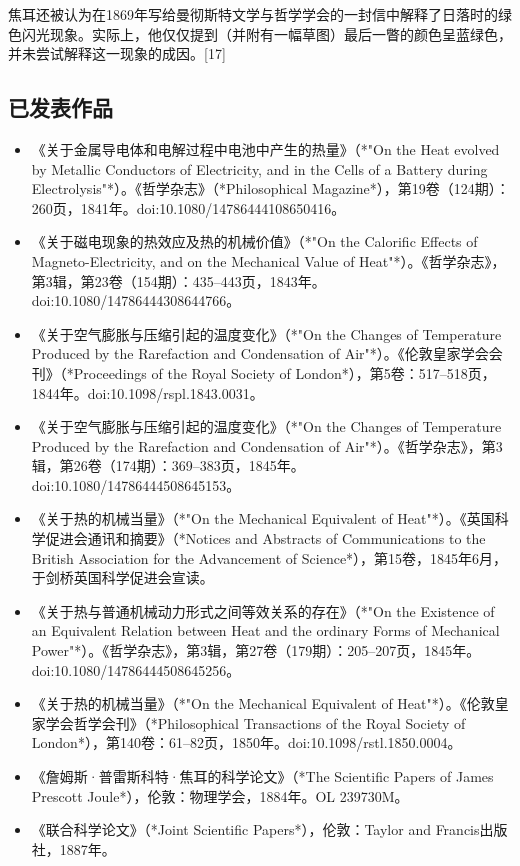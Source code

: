 焦耳还被认为在1869年写给曼彻斯特文学与哲学学会的一封信中解释了日落时的绿色闪光现象。实际上，他仅仅提到（并附有一幅草图）最后一瞥的颜色呈蓝绿色，并未尝试解释这一现象的成因。[17]

\subsection{已发表作品}

\begin{itemize}
\item 《关于金属导电体和电解过程中电池中产生的热量》（*"On the Heat evolved by Metallic Conductors of Electricity, and in the Cells of a Battery during Electrolysis"*）。《哲学杂志》（*Philosophical Magazine*），第19卷（124期）：260页，1841年。doi:10.1080/14786444108650416。  
\item 《关于磁电现象的热效应及热的机械价值》（*"On the Calorific Effects of Magneto-Electricity, and on the Mechanical Value of Heat"*）。《哲学杂志》，第3辑，第23卷（154期）：435–443页，1843年。doi:10.1080/14786444308644766。  
\item 《关于空气膨胀与压缩引起的温度变化》（*"On the Changes of Temperature Produced by the Rarefaction and Condensation of Air"*）。《伦敦皇家学会会刊》（*Proceedings of the Royal Society of London*），第5卷：517–518页，1844年。doi:10.1098/rspl.1843.0031。  
\item 《关于空气膨胀与压缩引起的温度变化》（*"On the Changes of Temperature Produced by the Rarefaction and Condensation of Air"*）。《哲学杂志》，第3辑，第26卷（174期）：369–383页，1845年。doi:10.1080/14786444508645153。  
\item 《关于热的机械当量》（*"On the Mechanical Equivalent of Heat"*）。《英国科学促进会通讯和摘要》（*Notices and Abstracts of Communications to the British Association for the Advancement of Science*），第15卷，1845年6月，于剑桥英国科学促进会宣读。  
\item 《关于热与普通机械动力形式之间等效关系的存在》（*"On the Existence of an Equivalent Relation between Heat and the ordinary Forms of Mechanical Power"*）。《哲学杂志》，第3辑，第27卷（179期）：205–207页，1845年。doi:10.1080/14786444508645256。  
\item 《关于热的机械当量》（*"On the Mechanical Equivalent of Heat"*）。《伦敦皇家学会哲学会刊》（*Philosophical Transactions of the Royal Society of London*），第140卷：61–82页，1850年。doi:10.1098/rstl.1850.0004。  
\item 《詹姆斯·普雷斯科特·焦耳的科学论文》（*The Scientific Papers of James Prescott Joule*），伦敦：物理学会，1884年。OL 239730M。  
\item 《联合科学论文》（*Joint Scientific Papers*），伦敦：Taylor and Francis出版社，1887年。  
\end{itemize}
